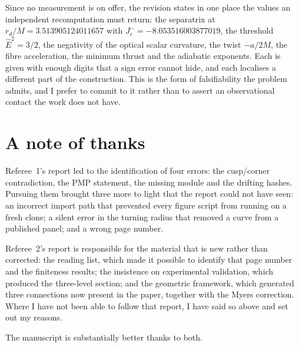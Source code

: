 \documentclass{article}
\begin{document}
Since no measurement is on offer, the revision states in one place the values an
independent recomputation must return: the separatrix at
\(r_d/M = 3.513905124011657\) with \(J_c^- = -8.053516003877019\), the threshold
\(\hat E^2 = 3/2\), the negativity of the optical scalar curvature, the twist
\(-a/2M\), the fibre acceleration, the minimum thrust and the adiabatic exponents.
Each is given with enough digits that a sign error cannot hide, and each localises a
different part of the construction. This is the form of falsifiability the problem
admits, and I prefer to commit to it rather than to assert an observational contact
the work does not have.

\section{A note of thanks}

Referee~1's report led to the identification of four errors: the cusp/corner
contradiction, the PMP statement, the missing module and the drifting hashes.
Pursuing them brought three more to light that the report could not have seen: an
incorrect import path that prevented every figure script from running on a fresh
clone; a silent error in the turning radius that removed a curve from a published
panel; and a wrong page number.

Referee~2's report is responsible for the material that is new rather than
corrected: the reading list, which made it possible to identify that page number and
the finiteness results; the insistence on experimental validation, which produced the
three-level section; and the geometric framework, which generated three connections
now present in the paper, together with the Myers correction. Where I have not been
able to follow that report, I have said so above and set out my reasons.

The manuscript is substantially better thanks to both.
\end{document}
